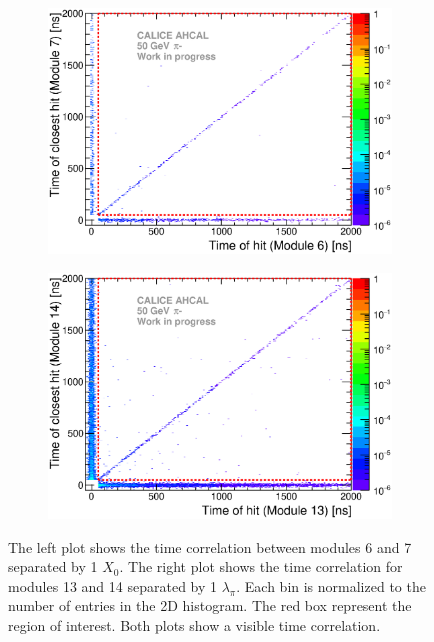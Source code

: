 \begin{figure}[htbp!]
	\begin{subfigure}[t]{0.49\textwidth}
		\centering
		\includegraphics[width=1\textwidth]{../Thesis_Plots/Timing/Pions/Plots/Time_Correlation_short.eps}
		\caption{} \label{fig:Time_Corr_short}
	\end{subfigure}
	\hfill
	\begin{subfigure}[t]{0.49\textwidth}
		\centering
		\includegraphics[width=1\textwidth]{../Thesis_Plots/Timing/Pions/Plots/Time_Correlation_long.eps}
		\caption{}\label{fig:Time_Corr_long}
	\end{subfigure}
	\caption{The left plot shows the time correlation between modules 6 and 7 separated by 1 $X_0$. The right plot shows the time correlation for modules 13 and 14 separated by 1 $\lambda_{\pi}$. Each bin is normalized to the number of entries in the 2D histogram. The red box represent the region of interest. Both plots show a visible time correlation.}
	\label{fig:TimeCorrelation}
\end{figure}
